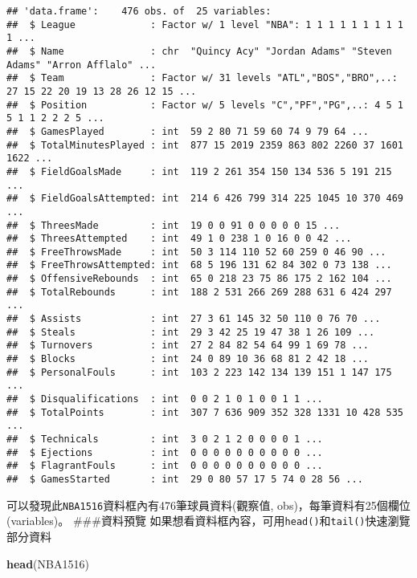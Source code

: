 \documentclass[]{book}
\newenvironment{Shaded}{\begin{snugshade}}{\end{snugshade}}
\newcommand{\KeywordTok}[1]{\textcolor[rgb]{0.13,0.29,0.53}{\textbf{{#1}}}}
\newcommand{\NormalTok}[1]{{#1}}
\begin{document}
\begin{verbatim}
## 'data.frame':    476 obs. of  25 variables:
##  $ League             : Factor w/ 1 level "NBA": 1 1 1 1 1 1 1 1 1 1 ...
##  $ Name               : chr  "Quincy Acy" "Jordan Adams" "Steven Adams" "Arron Afflalo" ...
##  $ Team               : Factor w/ 31 levels "ATL","BOS","BRO",..: 27 15 22 20 19 13 28 26 12 15 ...
##  $ Position           : Factor w/ 5 levels "C","PF","PG",..: 4 5 1 5 1 1 2 2 2 5 ...
##  $ GamesPlayed        : int  59 2 80 71 59 60 74 9 79 64 ...
##  $ TotalMinutesPlayed : int  877 15 2019 2359 863 802 2260 37 1601 1622 ...
##  $ FieldGoalsMade     : int  119 2 261 354 150 134 536 5 191 215 ...
##  $ FieldGoalsAttempted: int  214 6 426 799 314 225 1045 10 370 469 ...
##  $ ThreesMade         : int  19 0 0 91 0 0 0 0 0 15 ...
##  $ ThreesAttempted    : int  49 1 0 238 1 0 16 0 0 42 ...
##  $ FreeThrowsMade     : int  50 3 114 110 52 60 259 0 46 90 ...
##  $ FreeThrowsAttempted: int  68 5 196 131 62 84 302 0 73 138 ...
##  $ OffensiveRebounds  : int  65 0 218 23 75 86 175 2 162 104 ...
##  $ TotalRebounds      : int  188 2 531 266 269 288 631 6 424 297 ...
##  $ Assists            : int  27 3 61 145 32 50 110 0 76 70 ...
##  $ Steals             : int  29 3 42 25 19 47 38 1 26 109 ...
##  $ Turnovers          : int  27 2 84 82 54 64 99 1 69 78 ...
##  $ Blocks             : int  24 0 89 10 36 68 81 2 42 18 ...
##  $ PersonalFouls      : int  103 2 223 142 134 139 151 1 147 175 ...
##  $ Disqualifications  : int  0 0 2 1 0 1 0 0 1 1 ...
##  $ TotalPoints        : int  307 7 636 909 352 328 1331 10 428 535 ...
##  $ Technicals         : int  3 0 2 1 2 0 0 0 0 1 ...
##  $ Ejections          : int  0 0 0 0 0 0 0 0 0 0 ...
##  $ FlagrantFouls      : int  0 0 0 0 0 0 0 0 0 0 ...
##  $ GamesStarted       : int  29 0 80 57 17 5 74 0 28 56 ...
\end{verbatim}

可以發現此\texttt{NBA1516}資料框內有476筆球員資料(觀察值,
obs)，每筆資料有25個欄位 (variables)。 \#\#\#資料預覽
如果想看資料框內容，可用\texttt{head()}和\texttt{tail()}快速瀏覽部分資料

\begin{Shaded}
\begin{Highlighting}[]
\KeywordTok{head}\NormalTok{(NBA1516)}
\end{Highlighting}
\end{Shaded}
\end{document}
